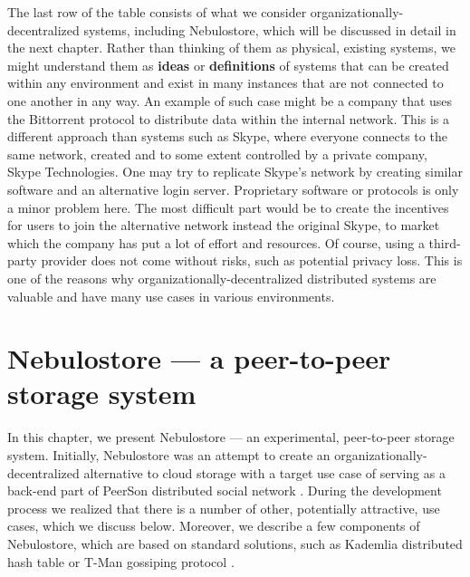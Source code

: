 \documentclass{pracamgren}
\begin{document}
The last row of the table consists of what we consider organizationally-decentralized systems, including Nebulostore, which will be discussed in detail in the next chapter. Rather than thinking of them as physical, existing systems, we might understand them as {\bf ideas} or {\bf definitions} of systems that can be created within any environment and exist in many instances that are not connected to one another in any way. An example of such case might be a company that uses the Bittorrent protocol to distribute data within the internal network. This is a different approach than systems such as Skype, where everyone connects to the same network, created and to some extent controlled by a private company, Skype Technologies. One may try to replicate Skype's network by creating similar software and an alternative login server. Proprietary software or protocols is only a minor problem here. The most difficult part would be to create the incentives for users to join the alternative network instead the original Skype, to market which the company has put a lot of effort and resources. Of course, using a third-party provider does not come without risks, such as potential privacy loss. This is one of the reasons why organizationally-decentralized distributed systems are valuable and have many use cases in various environments.\\




%
%
%
%
\chapter{Nebulostore --- a peer-to-peer storage system}\label{chap::nebulo}

In this chapter, we present Nebulostore --- an experimental, peer-to-peer storage system. Initially, Nebulostore was an attempt to create an organizationally-decentralized alternative to cloud storage with a target use case of serving as a back-end part of PeerSon distributed social network \cite{peerson}. During the development process we realized that there is a number of other, potentially attractive, use cases, which we discuss below. Moreover, we describe a few components of Nebulostore, which are based on standard solutions, such as Kademlia distributed hash table \cite{kademlia} or T-Man gossiping protocol \cite{tman}.\\
\end{document}
